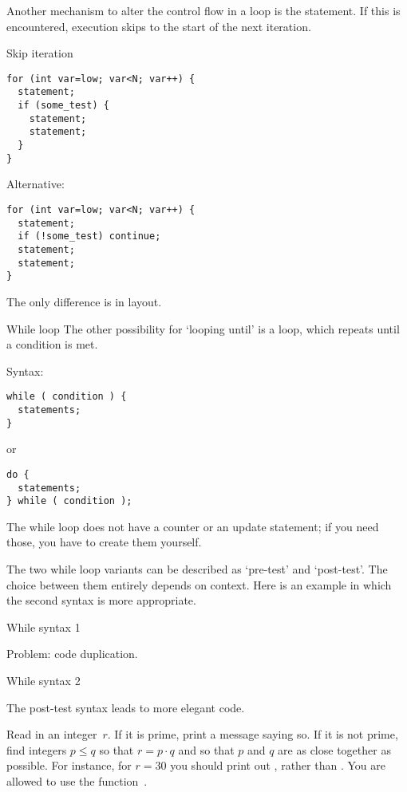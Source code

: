 Another mechanism to alter the control flow in a loop is the
 statement. If this is encountered, execution
skips to the start of the next iteration.

\begin{block}{Skip iteration}
  \label{sl:for-cont}
\begin{verbatim}
for (int var=low; var<N; var++) {
  statement;
  if (some_test) {
    statement;
    statement;
  }
}
\end{verbatim}
Alternative:
\begin{verbatim}
for (int var=low; var<N; var++) {
  statement;
  if (!some_test) continue;
  statement;
  statement;
}
\end{verbatim}
The only difference is in layout.
\end{block}

\begin{block}{While loop}
  \label{sl:while}
  The other possibility for `looping until' is a
   loop, which repeats until a condition is met.

  Syntax:
\begin{verbatim}
while ( condition ) {
  statements;
}
\end{verbatim}
or
\begin{verbatim}
do {
  statements;
} while ( condition );
\end{verbatim}
The while loop does not have a counter or an update statement; if you
need those, you have to create them yourself.
\end{block}

The two while loop variants can be described as `pre-test' and
`post-test'. The choice between them entirely depends on context. Here
is an example in which the second syntax is more appropriate.

\begin{block}{While syntax 1}
  \label{sl:while2}

  Problem: code duplication.
\end{block}

\begin{block}{While syntax 2}
  \label{sl:while3}

  The post-test syntax leads to more elegant code.
\end{block}

\begin{exercise}
  \label{ex:squaregrid}
  Read in an integer~$r$. If it is prime, print a message saying so.
  If it is not prime, find integers $p\leq q$ so that $r=p\cdot q$ and so
  that $p$ and $q$ are as close together as possible.
  For instance, for $r=30$ you should print out , rather than
  . You are allowed to use the function~.
\end{exercise}

